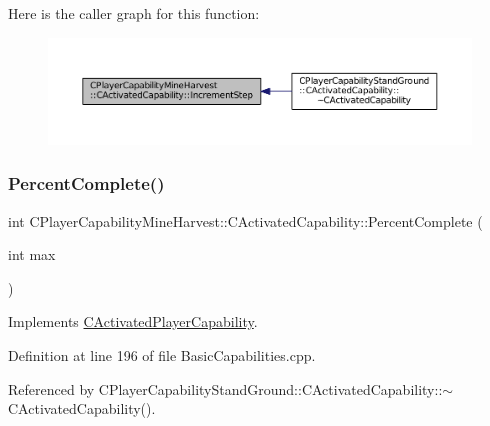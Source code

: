 Here is the caller graph for this function\+:\nopagebreak
\begin{figure}[H]
\begin{center}
\leavevmode
\includegraphics[width=350pt]{classCPlayerCapabilityMineHarvest_1_1CActivatedCapability_a46dbd6e2ae2fb889da1714c97ed3ca2f_icgraph}
\end{center}
\end{figure}
\hypertarget{classCPlayerCapabilityMineHarvest_1_1CActivatedCapability_ac198166a008306dc543ceed94baaf4a3}{}\label{classCPlayerCapabilityMineHarvest_1_1CActivatedCapability_ac198166a008306dc543ceed94baaf4a3} 
\subsubsection{\texorpdfstring{Percent\+Complete()}{PercentComplete()}}
{\footnotesize\ttfamily int C\+Player\+Capability\+Mine\+Harvest\+::\+C\+Activated\+Capability\+::\+Percent\+Complete (\begin{DoxyParamCaption}\item[{int}]{max }\end{DoxyParamCaption})\hspace{0.3cm}{\ttfamily [virtual]}}



Implements \hyperlink{classCActivatedPlayerCapability_a405dc6076058006a4f801727de4cfe4d}{C\+Activated\+Player\+Capability}.



Definition at line 196 of file Basic\+Capabilities.\+cpp.



Referenced by C\+Player\+Capability\+Stand\+Ground\+::\+C\+Activated\+Capability\+::$\sim$\+C\+Activated\+Capability().


